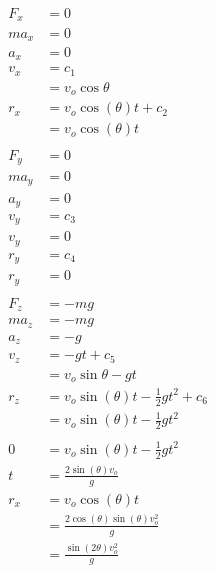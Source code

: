 \documentclass{article}
\begin{document}
\begin{align*}
  F_x   & = 0                                             \\
  m a_x & = 0                                             \\
  a_x   & = 0                                             \\
  v_x   & = c_1                                           \\
        & = v_o \cos \theta                               \\
  r_x   & = v_o \cos (\theta) t + c_2                     \\
        & = v_o \cos (\theta) t                           \\ \\
  F_y   & = 0                                             \\
  m a_y & = 0                                             \\
  a_y   & = 0                                             \\
  v_y   & = c_3                                           \\
  v_y   & = 0                                             \\
  r_y   & = c_4                                           \\
  r_y   & = 0                                             \\ \\
  F_z   & = -m g                                          \\
  m a_z & = -m g                                          \\
  a_z   & = -g                                            \\
  v_z   & = -g t + c_5                                    \\
        & = v_o \sin \theta - g t                         \\
  r_z   & = v_o \sin (\theta) t - \frac{1}{2} g t^2 + c_6 \\
        & = v_o \sin (\theta) t - \frac{1}{2} g t^2       \\ \\
  0     & = v_o \sin (\theta) t - \frac{1}{2} g t^2       \\
  t     & = \frac{2 \sin (\theta) v_o}{g}                 \\
  r_x   & = v_o \cos (\theta) t                           \\
        & = \frac{2 \cos (\theta) \sin (\theta) v_o^2}{g} \\
        & = \frac{\sin (2 \theta) v_o^2}{g}
\end{align*}
\end{document}
